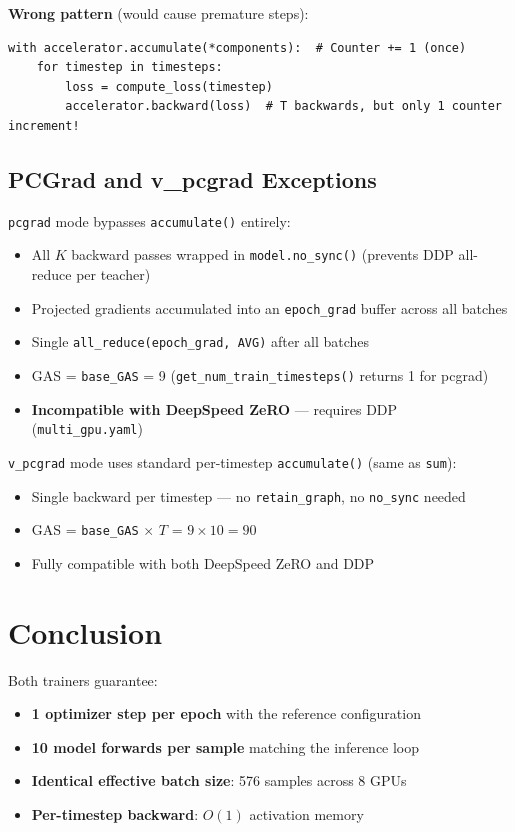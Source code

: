 \documentclass[11pt]{article}
\begin{document}
\textbf{Wrong pattern} (would cause premature steps):
\begin{lstlisting}
with accelerator.accumulate(*components):  # Counter += 1 (once)
    for timestep in timesteps:
        loss = compute_loss(timestep)
        accelerator.backward(loss)  # T backwards, but only 1 counter increment!
\end{lstlisting}

\subsection{PCGrad and v\_pcgrad Exceptions}

\texttt{pcgrad} mode bypasses \texttt{accumulate()} entirely:
\begin{itemize}[nosep]
    \item All $K$ backward passes wrapped in \texttt{model.no\_sync()} (prevents DDP all-reduce per teacher)
    \item Projected gradients accumulated into an \texttt{epoch\_grad} buffer across all batches
    \item Single \texttt{all\_reduce(epoch\_grad, AVG)} after all batches
    \item GAS = \texttt{base\_GAS} = 9 (\texttt{get\_num\_train\_timesteps()} returns 1 for pcgrad)
    \item \textbf{Incompatible with DeepSpeed ZeRO} --- requires DDP (\texttt{multi\_gpu.yaml})
\end{itemize}

\texttt{v\_pcgrad} mode uses standard per-timestep \texttt{accumulate()} (same as \texttt{sum}):
\begin{itemize}[nosep]
    \item Single backward per timestep --- no \texttt{retain\_graph}, no \texttt{no\_sync} needed
    \item GAS = \texttt{base\_GAS} $\times$ $T$ = $9 \times 10 = 90$
    \item Fully compatible with both DeepSpeed ZeRO and DDP
\end{itemize}

\section{Conclusion}

Both trainers guarantee:
\begin{itemize}[nosep]
    \item \textbf{1 optimizer step per epoch} with the reference configuration
    \item \textbf{10 model forwards per sample} matching the inference loop
    \item \textbf{Identical effective batch size}: 576 samples across 8 GPUs
    \item \textbf{Per-timestep backward}: $O(1)$ activation memory
\end{itemize}
\end{document}
